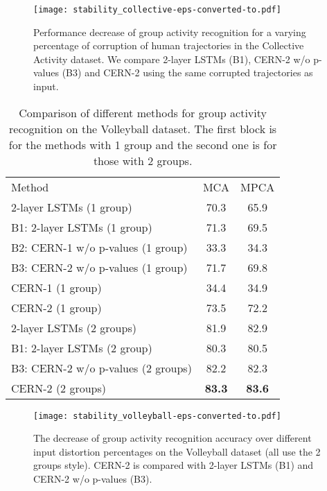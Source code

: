 \documentclass[10pt,twocolumn,letterpaper]{article}
\begin{document}
      \begin{figure}[t!]
      \centering
      \texttt{[image: stability\_collective-eps-converted-to.pdf]}
      \caption{Performance decrease of group activity recognition for a varying percentage of corruption of human trajectories in the Collective Activity dataset. We compare 2-layer LSTMs (B1), CERN-2 w/o p-values (B3) and CERN-2 using the same corrupted trajectories as input.}
      \label{fig:stability_collective}
   \end{figure}
   
\begin{table} 
\centering
\begin{tabular}{|l|c|c|}
\hline
Method & MCA & MPCA\\ \hhline{===}
2-layer LSTMs \cite{Ibrahim2016} (1 group)		&	 70.3 	&	65.9\\ \hline
B1: 2-layer LSTMs (1 group)					&	 71.3		&	69.5\\ \hline
B2: CERN-1 w/o p-values	(1 group)				&	 33.3		& 	34.3\\ \hline
B3: CERN-2 w/o p-values	(1 group)				&	 71.7		& 	69.8\\ \hline
CERN-1 (1 group)							&	 34.4		& 	34.9\\ \hline
CERN-2 (1 group)							& 	 73.5		&	72.2\\ \hhline{===}
2-layer LSTMs \cite{Ibrahim2016} (2 groups)		&	 81.9 	&	82.9\\ \hline
B1: 2-layer LSTMs (2 group)					&	 80.3		&	80.5\\ \hline
B3: CERN-2 w/o p-values	(2 groups)				&	 82.2		& 	82.3\\ \hline
CERN-2 (2 groups)							& 	 \bf{83.3}	&	\bf{83.6}\\ \hline
\end{tabular}
\caption{Comparison of different methods for group activity recognition on the Volleyball dataset. The first block is for the methods with 1 group and the second one is for those with 2 groups.}
\label{table:volleyball}
\end{table}

      \begin{figure}[t!]
      \centering
      \texttt{[image: stability\_volleyball-eps-converted-to.pdf]}
      \caption{The decrease of group activity recognition accuracy over different input distortion percentages on the Volleyball dataset (all use the 2 groups style). CERN-2 is compared with 2-layer LSTMs (B1) and CERN-2 w/o p-values (B3).}
      \vspace{-10pt}
      \label{fig:stability_volleyball}
   \end{figure}
   
\end{document}
